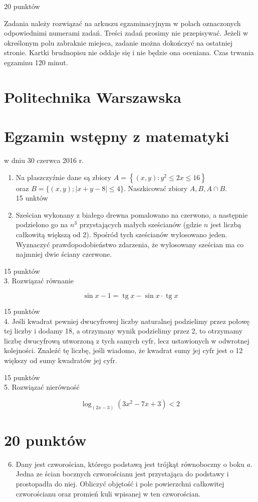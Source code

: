 \documentclass[10pt]{article}
\begin{document}
20 punktów

Zadania należy rozwiązać na arkuszu egzaminacyjnym w polach oznaczonych odpowiednimi numerami zadań. Treści zadań prosimy nie przepisywać. Jeżeli w określonym polu zabraknie miejsca, zadanie można dokończyć na ostatniej stronie. Kartki brudnopisu nie oddaje się i nie będzie ona oceniana. Czas trwania egzaminu 120 minut.

\section*{Politechnika Warszawska}
\section*{Egzamin wstępny z matematyki}
w dniu 30 czerwca 2016 r.

\begin{enumerate}
  \item Na płaszczyźnie dane są zbiory \(A=\left\{(x, y): y^{2} \leq 2 x \leq 16\right\}\)\\
oraz \(B=\{(x, y) ;|x+y-8| \leq 4\}\). Naszkicować zbiory \(A, B, A \cap B\).\\
15 unktów
  \item Sześcian wykonany z białego drewna pomalowano na czerwono, a następnie podzielono go na \(n^{3}\) przystających małych sześcianów (gdzie \(n\) jest liczbą całkowitą większą od 2). Spośród tych sześcianów wylosowano jeden. Wyznaczyć prawdopodobieństwo zdarzenia, że wylosowany sześcian ma co najmniej dwie ściany czerwone.
\end{enumerate}

15 punktów\\
3. Rozwiązać równanie

\[
\sin x-1=\operatorname{tg} x-\sin x \cdot \operatorname{tg} x
\]

15 punktów\\
4. Jeśli kwadrat pewniej dwucyfrowej liczby naturalnej podzielimy przez połowę tej liczby i dodamy 18, a otrzymany wynik podzielimy przez 2, to otrzymamy liczbę dwucyfrową utworzoną z tych samych cyfr, lecz ustawionych w odwrotnej kolejności. Znaleźć tę liczbę, jeśli wiadomo, że kwadrat sumy jej cyfr jest o 12 większy od sumy kwadratów jej cyfr.

15 punktów\\
5. Rozwiązać nierówność

\[
\log _{(2 x-3)}\left(3 x^{2}-7 x+3\right)<2
\]

\section*{20 punktów}
\begin{enumerate}
  \setcounter{enumi}{5}
  \item Dany jest czworościan, którego podstawą jest trójkąt równoboczny o boku \(a\). Jedna ze ścian bocznych czworościanu jest przystająca do podstawy i prostopadła do niej. Obliczyć objętość i pole powierzchni całkowitej czworościanu oraz promień kuli wpisanej w ten czworościan.
\end{enumerate}
\end{document}
